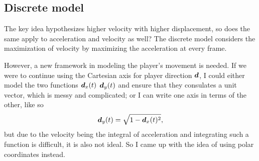 \subsection{Discrete model}
The key idea hypothesizes higher velocity with higher displacement, so does the same apply to acceleration and velocity as well? The discrete model considers the maximization of velocity by maximizing the acceleration at every frame.

However, a new framework in modeling the player's movement is needed. If we were to continue using the Cartesian axis for player direction $\boldsymbol{d}$, I could either model the two functions $\boldsymbol{d}_x(t)$ $\boldsymbol{d}_y(t)$ and ensure that they consulates a unit vector, which is messy and complicated; or I can write one axis in terms of the other, like so
\[
    \boldsymbol{d}_y(t) = \sqrt{1-\boldsymbol{d}_x(t)^2},
\]
but due to the velocity being the integral of acceleration and integrating such a function is difficult, it is also not ideal. So I came up with the idea of using polar coordinates instead.



